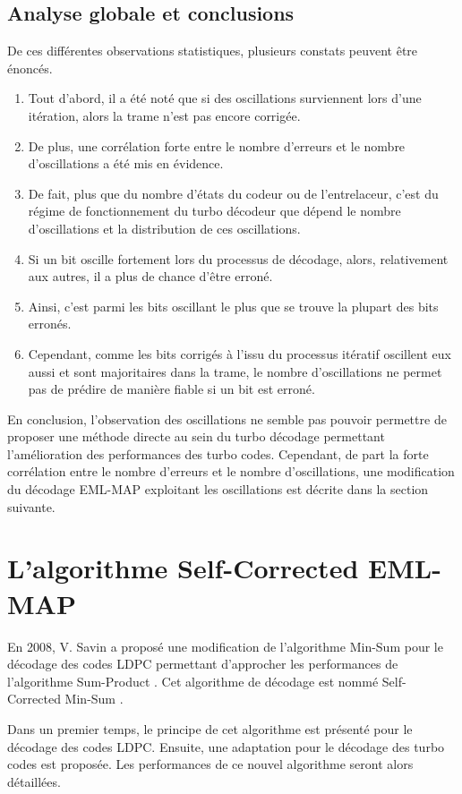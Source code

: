 \subsection{Analyse globale et conclusions}
De ces différentes observations statistiques, plusieurs constats peuvent être énoncés.
\begin{enumerate}
\item Tout d'abord, il a été noté que si des oscillations surviennent lors d'une itération, alors la trame n'est pas encore 
corrigée. 
\item De plus, une corrélation forte entre le nombre d'erreurs et le nombre d'oscillations a été mis en évidence. 
\item De fait, plus que du nombre d'états du codeur ou de l'entrelaceur, c'est du régime de fonctionnement du turbo décodeur que dépend
le nombre d'oscillations et la distribution de ces oscillations.
\item Si un bit oscille fortement lors du processus de décodage, alors, relativement aux autres, il a plus de chance d'être erroné.
\item Ainsi, c'est parmi les bits oscillant le plus que se trouve la plupart des bits erronés.
\item Cependant, comme les bits corrigés à l'issu du processus itératif oscillent eux aussi et sont majoritaires dans la 
trame, le nombre d'oscillations ne permet pas de prédire de manière fiable si un bit est erroné.
\end{enumerate}

En conclusion, l'observation des oscillations ne semble pas pouvoir permettre de proposer une méthode directe au sein du 
turbo décodage permettant l'amélioration des performances des turbo codes. Cependant, de part la forte corrélation entre 
le nombre d'erreurs et le nombre d'oscillations, une modification du décodage EML-MAP exploitant les oscillations est décrite 
dans la section suivante.
\section{L’algorithme Self-Corrected EML-MAP}
En 2008, V. Savin  a proposé une modification de l'algorithme Min-Sum \cite{wiberg1996codes} pour le décodage des codes 
LDPC permettant d'approcher les performances de l'algorithme Sum-Product \cite{wiberg1996codes}. Cet algorithme de 
décodage est nommé Self-Corrected Min-Sum \cite{savin_sc}.

Dans un premier temps, le principe de cet algorithme est présenté pour le décodage des codes LDPC. Ensuite, une 
adaptation pour le décodage des turbo codes est proposée. Les performances de ce nouvel algorithme seront alors détaillées.

